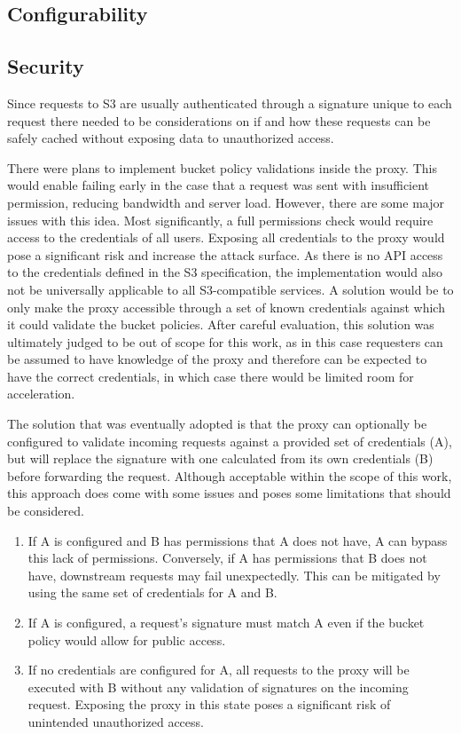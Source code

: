 \subsection{Configurability}

\subsection{Security}
\label{security}

Since requests to S3 are usually authenticated through a signature unique to each request there needed to be considerations on if and how these requests can be safely cached without exposing data to unauthorized access.

There were plans to implement bucket policy validations inside the proxy. This would enable failing early in the case that a request was sent with insufficient permission, reducing bandwidth and server load. However, there are some major issues with this idea.
Most significantly, a full permissions check would require access to the credentials of all users. Exposing all credentials to the proxy would pose a significant risk and increase the attack surface. As there is no API access to the credentials defined in the S3 specification, the implementation would also not be universally applicable to all S3-compatible services.
A solution would be to only make the proxy accessible through a set of known credentials against which it could validate the bucket policies. After careful evaluation, this solution was ultimately judged to be out of scope for this work, as in this case requesters can be assumed to have knowledge of the proxy and therefore can be expected to have the correct credentials, in which case there would be limited room for acceleration.

The solution that was eventually adopted is that the proxy can optionally be configured to validate incoming requests against a provided set of credentials (A), but will replace the signature with one calculated from its own credentials (B) before forwarding the request.
Although acceptable within the scope of this work, this approach does come with some issues and poses some limitations that should be considered. 
\begin{enumerate}
	\item If A is configured and B has permissions that A does not have, A can bypass this lack of permissions. Conversely, if A has permissions that B does not have, downstream requests may fail unexpectedly. This can be mitigated by using the same set of credentials for A and B.
	\item If A is configured, a request's signature must match A even if the bucket policy would allow for public access.
	\item If no credentials are configured for A, all requests to the proxy will be executed with B without any validation of signatures on the incoming request. Exposing the proxy in this state poses a significant risk of unintended unauthorized access.
\end{enumerate}


